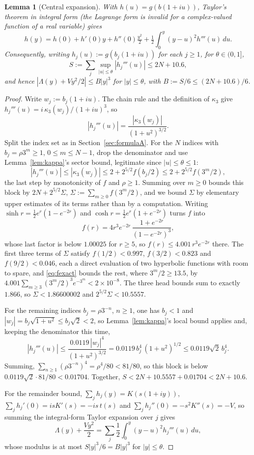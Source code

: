 \documentclass[11pt]{article}
\newtheorem{lemma}[theorem]{Lemma}
\theoremstyle{definition}
\theoremstyle{remark}
\begin{document}
\begin{lemma}[Central expansion]
\label{lem:taylor}
With $h(u) = g(b(1+iu))$, Taylor's theorem in \emph{integral} form (the Lagrange form is invalid
for a complex-valued function of a real variable) gives
\[
h(y) = h(0)+h'(0)y+h''(0)\tfrac{y^2}{2} + \tfrac12\int_0^y (y-u)^2 h'''(u)\,du.
\]
Consequently, writing $h_j(u) := g(b_j(1+iu))$ for each $j\ge1$, for $\theta\in(0,1]$,
\[
S := \sum_j \sup_{|u|\le \theta}|h_j'''(u)| \le 2N + 10.6,
\]
and hence $|\Lambda(y) + Vy^2/2| \le B|y|^3$ for $|y|\le \theta$, with $B := S/6 \le (2N+10.6)/6$.
\end{lemma}

\begin{proof}
Write $w_j := b_j(1+iu)$. The chain rule and the definition of
$\kappa_3$ give $h_j'''(u) = i\,\kappa_3(w_j)/(1+iu)^3$, so
\[
|h_j'''(u)| = \frac{|\kappa_3(w_j)|}{(1+u^2)^{3/2}}.
\]
Split the index set as in Section~\ref{sec:formulaA}. For the $N$ indices with $b_j = \rho3^m \ge
1$, $0\le m\le N-1$, drop the denominator and use Lemma~\ref{lem:kappa}'s sector bound, legitimate
since $|u|\le\theta\le1$:
\[
|h_j'''(u)| \le |\kappa_3(w_j)| \le 2 + 2^{5/2} f(b_j/2) \le 2 + 2^{5/2} f(3^m/2),
\]
the last step by monotonicity of $f$ and $\rho\ge1$. Summing over $m\ge0$ bounds this block by
$2N + 2^{5/2}\Sigma$, $\Sigma := \sum_{m\ge0} f(3^m/2)$, and we bound $\Sigma$ by elementary
upper estimates of its terms rather than by a computation. Writing $\sinh r =
\tfrac12e^r(1-e^{-2r})$ and $\cosh r = \tfrac12e^r(1+e^{-2r})$ turns $f$ into
\begin{equation}\label{eq:fexact}
 f(r) = 4r^3e^{-2r}\,\frac{1+e^{-2r}}{(1-e^{-2r})^3},
\end{equation}
whose last factor is below $1.00025$ for $r\ge5$, so $f(r)\le4.001\,r^3e^{-2r}$ there. The first
three terms of $\Sigma$ satisfy $f(1/2)<0.997$, $f(3/2)<0.823$ and $f(9/2)<0.046$, each a direct
evaluation of two hyperbolic functions with room to spare, and \eqref{eq:fexact} bounds the rest,
where $3^m/2\ge13.5$, by $4.001\sum_{m\ge3}(3^m/2)^3e^{-3^m} < 2\times10^{-8}$. The three head
bounds sum to exactly $1.866$, so $\Sigma < 1.86600002$ and $2^{5/2}\Sigma < 10.5557$.

For the remaining indices $b_j = \rho 3^{-n}$, $n\ge1$, one has $b_j<1$ and $|w_j| =
b_j\sqrt{1+u^2} \le b_j\sqrt2 < 2$, so Lemma~\ref{lem:kappa}'s local bound applies and, keeping
the denominator this time,
\[
|h_j'''(u)| \le \frac{0.0119\,|w_j|^4}{(1+u^2)^{3/2}} = 0.0119\,b_j^4\,(1+u^2)^{1/2} \le
0.0119\sqrt2\,b_j^4 .
\]
Summing, $\sum_{n\ge1}(\rho3^{-n})^4 = \rho^4/80 < 81/80$, so this block is below
$0.0119\sqrt2\cdot81/80 < 0.01704$. Together, $S < 2N + 10.5557 + 0.01704 < 2N + 10.6$.

For the remainder bound, $\sum_j h_j(y) = K(s(1+iy))$, $\sum_j h_j'(0) = isK'(s) = -is\,t(s)$ and
$\sum_j h_j''(0) = -s^2K''(s) = -V$, so summing the integral-form Taylor expansion over $j$ gives
\[
\Lambda(y) + \frac{Vy^2}{2} = \sum_j \frac12\int_0^y (y-u)^2 h_j'''(u)\,du,
\]
whose modulus is at most $S|y|^3/6 = B|y|^3$ for $|y|\le\theta$.
\end{proof}
\end{document}
